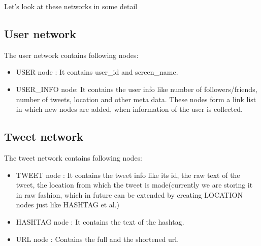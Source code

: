 \documentclass[letterpaper,10pt,english]{sphinxmanual}
\begin{document}
Let’s look at these networks in some detail


\subsection{User network}
\label{\detokenize{neo4j_data_ingestion:user-network}}
The user network contains following nodes:
\begin{itemize}
\item {} 
USER node : It contains user\_id and screen\_name.

\item {} 
USER\_INFO node: It contains the user info like number of followers/friends, number of tweets, location and other meta data. These nodes form a link list in which new nodes are added, when information of the user is collected.

\end{itemize}

\noindent{}

\noindent{}


\subsection{Tweet network}
\label{\detokenize{neo4j_data_ingestion:tweet-network}}
The tweet network contains following nodes:
\begin{itemize}
\item {} 
TWEET node : It contains the tweet info like its id, the raw text of the tweet, the location from which the tweet is made(currently we are storing it in raw fashion, which in future can be extended by creating LOCATION nodes just like HASHTAG et al.)

\item {} 
HASHTAG node : It contains the text of the hashtag.

\item {} 
URL node : Contains the full and the shortened url.

\end{itemize}

\noindent{}
\end{document}
